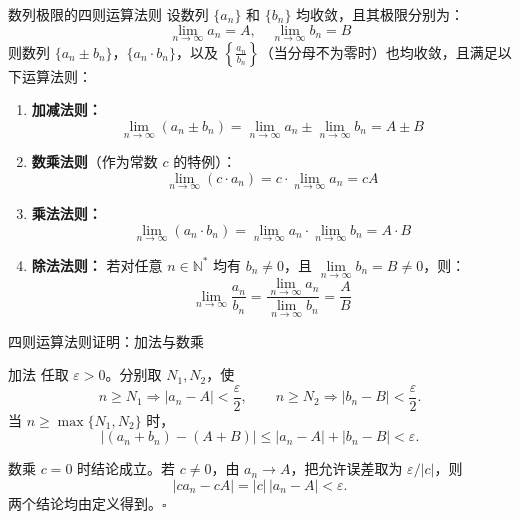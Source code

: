 \documentclass[aspectratio=169,10pt]{ctexbeamer}
\newcommand{\eps}{\varepsilon}
\newcommand{\qedhereppt}{\hfill$\square$}
\begin{document}
\begin{frame}
 \footnotesize
  \begin{block}{数列极限的四则运算法则}
    设数列 $\{a_n\}$ 和 $\{b_n\}$ 均收敛，且其极限分别为：
    \begin{equation*}
    	\lim\limits_{n \to \infty} a_n = A, \quad \lim\limits_{n \to \infty} b_n = B
    \end{equation*}
    则数列 $\{a_n \pm b_n\}$，$\{a_n \cdot b_n\}$，以及 $\left\{\frac{a_n}{b_n}\right\}$（当分母不为零时）也均收敛，且满足以下运算法则：
    
    \begin{enumerate}
    	\item \textbf{加减法则：}
    	\begin{equation*}
    		\lim\limits_{n \to \infty} (a_n \pm b_n) = \lim\limits_{n \to \infty} a_n \pm \lim\limits_{n \to \infty} b_n = A \pm B
    	\end{equation*}
    	
    	\item \textbf{数乘法则}（作为常数 $c$ 的特例）：
    	\begin{equation*}
    		\lim\limits_{n \to \infty} (c \cdot a_n) = c \cdot \lim\limits_{n \to \infty} a_n = cA
    	\end{equation*}
    	
    	\item \textbf{乘法法则：}
    	\begin{equation*}
    		\lim_{n \to \infty} (a_n \cdot b_n) = \lim_{n \to \infty} a_n \cdot \lim_{n \to \infty} b_n = A \cdot B
    	\end{equation*}
    	
    	\item \textbf{除法法则：}
    	若对任意 $n \in \mathbb{N}^*$ 均有 $b_n \neq 0$，且 $\lim\limits_{n \to \infty} b_n = B \neq 0$，则：
    	\[
    		\lim_{n \to \infty} \frac{a_n}{b_n} = \frac{\lim\limits_{n \to \infty} a_n}{\lim\limits_{n \to \infty} b_n} = \frac{A}{B}
    	\]
    \end{enumerate}
  \end{block}

\end{frame}

\begin{frame}{四则运算法则证明：加法与数乘}
  \footnotesize
  \begin{block}{加法}
    任取 $\eps>0$。分别取 $N_1,N_2$，使
    \[
      n\ge N_1\Rightarrow |a_n-A|<\frac\eps2,\qquad
      n\ge N_2\Rightarrow |b_n-B|<\frac\eps2.
    \]
    当 $n\ge\max\{N_1,N_2\}$ 时，
    \[
      |(a_n+b_n)-(A+B)|
      \le|a_n-A|+|b_n-B|<\eps.
    \]
  \end{block}
  \begin{block}{数乘}
    $c=0$ 时结论成立。若 $c\ne0$，由 $a_n\to A$，把允许误差取为 $\eps/|c|$，则
    \[
      |ca_n-cA|=|c|\,|a_n-A|<\eps.
    \]
    两个结论均由定义得到。\qedhereppt
  \end{block}
\end{frame}
\end{document}
